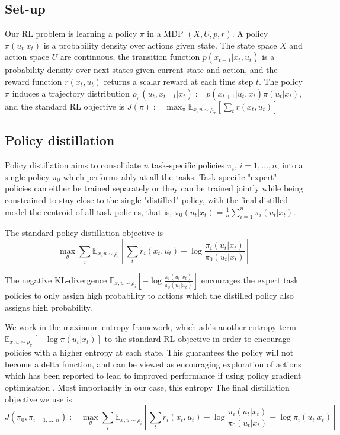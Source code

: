 \documentclass[a4paper]{article}
\begin{document}
\subsection{Set-up}
Our RL problem is learning a policy $\pi$ in a MDP $(X, U, p, r)$.
A policy $\pi(u_t \vert x_t)$ is a probability density over actions given state.
The state space $X$ and action space $U$ are continuous,
the transition function $p(x_{t+1} \vert x_{t}, u_{t})$ is a probability density over next states given current state and action,
and the reward function $r(x_t, u_t)$ returns a scalar reward at each time step $t$. 
The policy $\pi$ induces a trajectory distribution $\rho_{\pi}(u_t, x_{t+1} \vert x_t) := p(x_{t+1} \vert u_t, x_t) \pi(u_t \vert x_t)$, and the standard RL objective is 
$ J(\pi) := \max_{\pi} \mathbb{E}_{x, u \sim \rho_{\pi}}  [ \sum_t r(x_t, u_t) ] $

\subsection{Policy distillation}
Policy distillation aims to consolidate $n$ task-specific policies $\pi_i$, $i = 1, \dots, n$, into a single policy $\pi_0$ which performs ably at all the tasks. 
Task-specific "expert" policies can either be trained separately or they can be trained jointly while being constrained to stay close to the single "distilled" policy, with the final distilled model the centroid of all task policies, that is, $\pi_0(u_t \vert x_t) = \frac{1}{n} \sum_{i=1}^n \pi_i(u_t \vert x_t)$.

The standard policy distillation objective is 
$$\max_{\theta} \sum_i \mathbb{E}_{x, u \sim \rho_{i}} 
\left[ \sum_t 
	r_i(x_t, u_t) 
	- \log \frac{\pi_i(u_t \vert x_t)} {\pi_0(u_t \vert x_t)}
 \right] $$

The negative KL-divergence $\mathbb{E}_{x, u \sim \rho_i} \left[ - \log \frac{\pi_i(u_t \vert x_t)} {\pi_0(u_t \vert x_t)} \right]$ 
encourages the expert task policies to only assign high probability to actions which the distilled policy also assigns high probability.

We work in the maximum entropy framework, which adds another entropy term 
$\mathbb{E}_{x, u \sim \rho_{\pi}} \left[ - \log \pi(u_t \vert x_t ) \right]$
to the standard RL objective in order to encourage policies with a higher entropy at each state. This guarantees the policy will not become a delta function, and can be viewed as encouraging exploration of actions which has been reported to lead to improved performance if using policy gradient optimisation \citep{mnih2016asynchronous}. Most importantly in our case, this entropy 
The final distillation objective we use is
$$ J(\pi_0, \pi_{i=1,\dots,n}) := \max_{\theta} \sum_i \mathbb{E}_{x, u \sim \rho_{i}} 
\left[ \sum_t 
	r_i(x_t, u_t) 
	- \log \frac{\pi_i(u_t \vert x_t)} {\pi_0(u_t \vert x_t)} 
	- \log \pi_i (u_t \vert x_t) 
\right] $$
\end{document}
